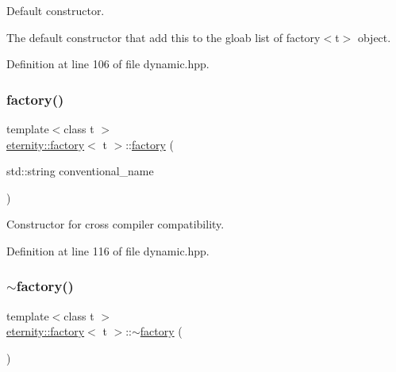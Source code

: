 Default constructor. 

The default constructor that add this to the gloab list of factory$<$t$>$ object. 

Definition at line 106 of file dynamic.\+hpp.

\mbox{\label{classeternity_1_1factory_aabaf1fee796b93628f897af8ac9c3ea9}} 
\subsubsection{\texorpdfstring{factory()}{factory()}\hspace{0.1cm}{\footnotesize\ttfamily [2/2]}}
{\footnotesize\ttfamily template$<$class t $>$ \\
\hyperlink{classeternity_1_1factory}{eternity\+::factory}$<$ t $>$\+::\hyperlink{classeternity_1_1factory}{factory} (\begin{DoxyParamCaption}\item[{std\+::string}]{conventional\+\_\+name }\end{DoxyParamCaption})}



Constructor for cross compiler compatibility. 



Definition at line 116 of file dynamic.\+hpp.

\mbox{\label{classeternity_1_1factory_a5abc378892135b2d5491d7380752bb84}} 
\subsubsection{\texorpdfstring{$\sim$factory()}{~factory()}}
{\footnotesize\ttfamily template$<$class t $>$ \\
\hyperlink{classeternity_1_1factory}{eternity\+::factory}$<$ t $>$\+::$\sim$\hyperlink{classeternity_1_1factory}{factory} (\begin{DoxyParamCaption}{ }\end{DoxyParamCaption})\hspace{0.3cm}{\ttfamily [virtual]}}



